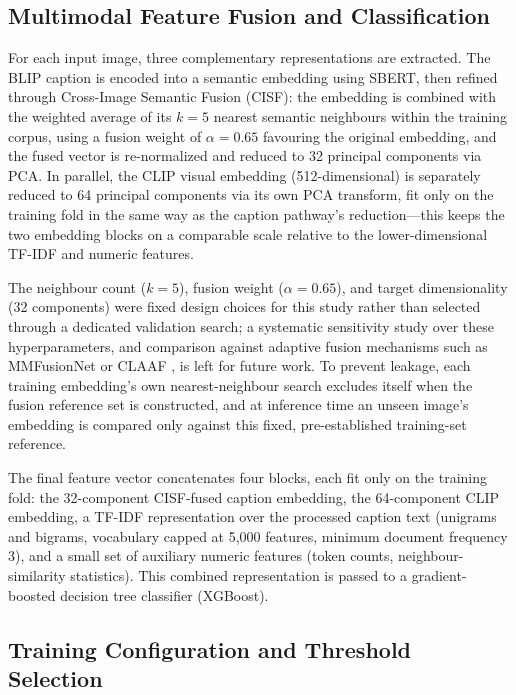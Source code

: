 \documentclass[conference,a4paper]{IEEEtran}
\begin{document}
\subsection{Multimodal Feature Fusion and Classification}

For each input image, three complementary representations are extracted. The
BLIP caption is encoded into a semantic embedding using SBERT, then refined
through Cross-Image Semantic Fusion (CISF): the embedding is combined with the
weighted average of its $k=5$ nearest semantic neighbours within the training
corpus, using a fusion weight of $\alpha=0.65$ favouring the original
embedding, and the fused vector is re-normalized and reduced to 32 principal
components via PCA. In parallel, the CLIP visual embedding (512-dimensional)
is separately reduced to 64 principal components via its own PCA transform,
fit only on the training fold in the same way as the caption pathway's
reduction---this keeps the two embedding blocks on a comparable scale relative
to the lower-dimensional TF-IDF and numeric features.

The neighbour count ($k=5$), fusion weight ($\alpha=0.65$), and target
dimensionality (32 components) were fixed design choices for this study rather
than selected through a dedicated validation search; a systematic sensitivity
study over these hyperparameters, and comparison against adaptive fusion
mechanisms such as MMFusionNet \cite{mmfusionnet} or CLAAF \cite{claaf}, is
left for future work. To prevent leakage, each training embedding's own
nearest-neighbour search excludes itself when the fusion reference set is
constructed, and at inference time an unseen image's embedding is compared
only against this fixed, pre-established training-set reference.

The final feature vector concatenates four blocks, each fit only on the
training fold: the 32-component CISF-fused caption embedding, the 64-component
CLIP embedding, a TF-IDF representation over the processed caption text
(unigrams and bigrams, vocabulary capped at 5{,}000 features, minimum document
frequency 3), and a small set of auxiliary numeric features (token counts,
neighbour-similarity statistics). This combined representation is passed to a
gradient-boosted decision tree classifier (XGBoost).

\subsection{Training Configuration and Threshold Selection}
\label{sec:training}
\end{document}
